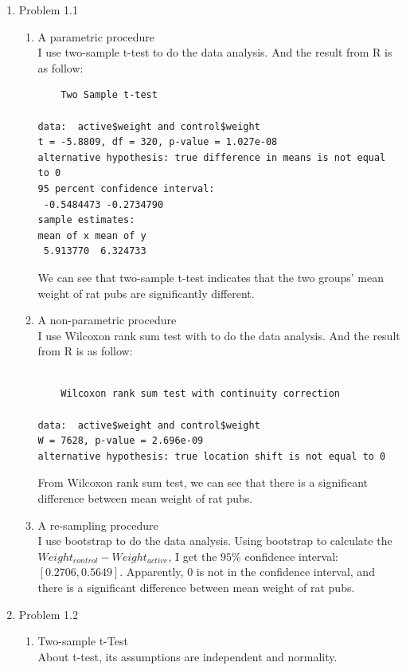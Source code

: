 \documentclass[12pt]{article}
\begin{document}
\begin{enumerate}
\item Problem 1.1
  \begin{enumerate}
  \item A parametric procedure\\
    I use two-sample t-test to do the data analysis. And the
    result from R is as follow:

\begin{verbatim}
	Two Sample t-test

data:  active$weight and control$weight 
t = -5.8809, df = 320, p-value = 1.027e-08
alternative hypothesis: true difference in means is not equal to 0 
95 percent confidence interval:
 -0.5484473 -0.2734790 
sample estimates:
mean of x mean of y 
 5.913770  6.324733 

\end{verbatim}

    We can see that two-sample t-test indicates that the two groups'
    mean weight of rat pubs are significantly different.

  \item A non-parametric procedure\\
    I use Wilcoxon rank sum test with to do the data analysis. And
    the result from R is as follow:

\begin{verbatim}

	Wilcoxon rank sum test with continuity correction

data:  active$weight and control$weight 
W = 7628, p-value = 2.696e-09
alternative hypothesis: true location shift is not equal to 0 

\end{verbatim}

    From Wilcoxon rank sum test, we can see that there is a
    significant difference between mean weight of rat pubs.

  \item A re-sampling procedure\\
    I use bootstrap to do the data analysis.
    Using bootstrap to calculate the $Weight_{control}-
    Weight_{active}$, I get the $95\%$ confidence interval: 
    $ [0.2706, 0.5649] $. Apparently, 0 is not in the confidence
    interval, and there is a significant difference between mean
    weight of rat pubs.

  \end{enumerate}

\item Problem 1.2\\
  \begin{enumerate}
  \item Two-sample t-Test\\
    About t-test, its assumptions are independent and
    normality.
    

\end{enumerate}
\end{enumerate}
\end{document}
